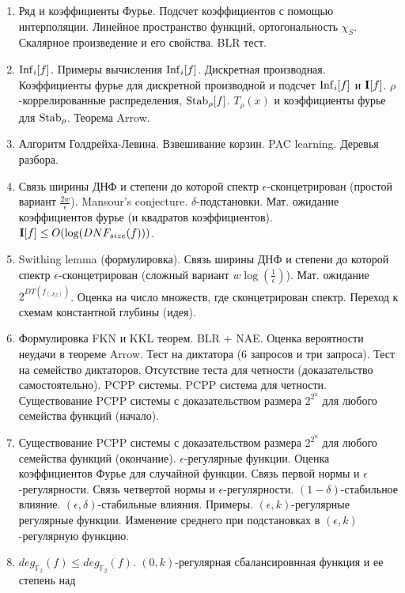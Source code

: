 \begin{enumerate}
    \item Ряд и коэффициенты Фурье. Подсчет коэффициентов с помощью интерполяции. Линейное пространство функций, ортогональность
        $\chi_S$. Скалярное произведение и его свойства. BLR тест.
    \item $\mathrm{Inf}_i[f]$. Примеры вычисления $\mathrm{Inf}_i[f]$. Дискретная производная. Коэффициенты фурье для дискретной производной и 
        подсчет $\mathrm{Inf}_i[f]$ и $\mathbf{I}[f]$. $\rho$-коррелированные распределения, $\mathrm{Stab}_{\rho}[f]$. $T_{\rho}(x)$ и коэффициенты фурье
        для $\mathrm{Stab}_{\rho}$. Теорема Arrow.
    \item Алгоритм Голдрейха-Левина. Взвешивание корзин. PAC learning. Деревья разбора.
    \item Связь ширины ДНФ и степени до которой спектр $\epsilon$-сконцетрирован (простой вариант
        $\frac{2w}{\epsilon}$). Mansour's conjecture. $\delta$-подстановки. Мат. ожидание коэффициентов фурье (и квадратов
        коэффициентов). $\mathbf{I}[f] \le O(\log(DNF_{size}(f)))$.
    \item Swithing lemma (формулировка). Связь ширины ДНФ и степени до которой спектр $\epsilon$-сконцетрирован (сложный вариант
        $w \log(\frac{1}{\epsilon})$). Мат. ожидание $2^{DT(f_{(J|z)})}$. Оценка на число множеств, где сконцетрирован
        спектр. Переход к схемам константной глубины (идея).
    \item Формулировка FKN и KKL теорем. BLR + NAE. Оценка вероятности неудачи в теореме Arrow. Тест на диктатора (6 запросов и
        три запроса). Тест на семейство диктаторов. Отсутствие теста для четности (доказательство самостоятельно). PCPP
        системы. PCPP система для четности. Существование PCPP системы с доказательством размера $2^{2^{n}}$ для любого семейства
        функций (начало).
    \item Существование PCPP системы с доказательством размера $2^{2^{n}}$ для любого семейства функций
        (окончание). $\epsilon$-регулярные функции. Оценка коэффициентов Фурье для случайной функции. Связь первой нормы и
        $\epsilon$-регулярности. Связь четвертой нормы и $\epsilon$-регулярности. $(1 - \delta)$-стабильное влияние. $(\epsilon,
        \delta)$-стабильные влияния. Примеры. $(\epsilon, k)$-регулярные регулярные функции. Изменение среднего при подстановках в
        $(\epsilon, k)$-регулярную функцию.
    \item $deg_{\mathbb{F}_2}(f) \le deg_{\mathbb{F}_2}(f)$. $(0, k)$-регулярная сбалансировнная функция и ее степень над

\end{enumerate}
